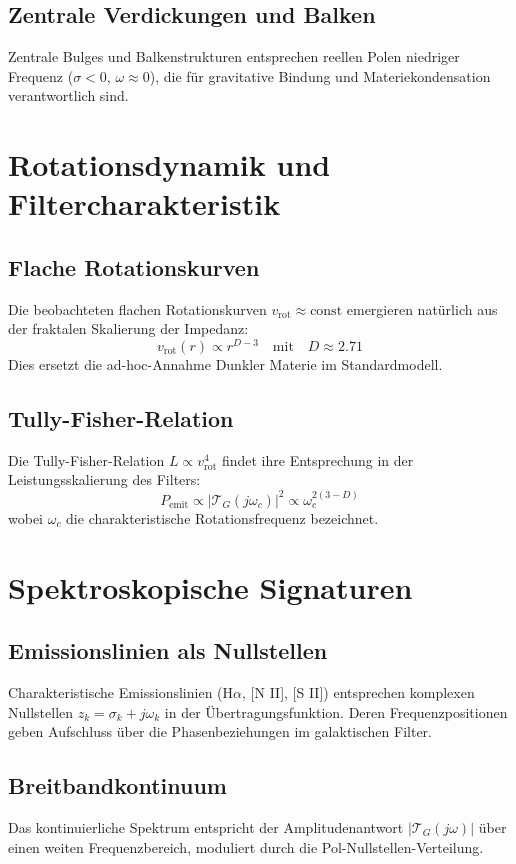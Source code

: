 \subsection{Zentrale Verdickungen und Balken}
Zentrale Bulges und Balkenstrukturen entsprechen reellen Polen niedriger Frequenz ($\sigma < 0$, $\omega \approx 0$), die für gravitative Bindung und Materiekondensation
verantwortlich sind.

\section{Rotationsdynamik und Filtercharakteristik}

\subsection{Flache Rotationskurven}
Die beobachteten flachen Rotationskurven $v_{\text{rot}} \approx \text{const}$ emergieren natürlich aus der fraktalen Skalierung der Impedanz:
\[
v_{\text{rot}}(r) \propto r^{D-3} \quad \text{mit} \quad D \approx 2.71
\]
Dies ersetzt die ad-hoc-Annahme Dunkler Materie im Standardmodell.

\subsection{Tully-Fisher-Relation}
Die Tully-Fisher-Relation $L \propto v_{\text{rot}}^4$ findet ihre Entsprechung in der Leistungsskalierung des Filters:
\[
P_{\text{emit}} \propto |\mathcal{T}_G(j\omega_c)|^2 \propto \omega_c^{2(3-D)}
\]
wobei $\omega_c$ die charakteristische Rotationsfrequenz bezeichnet.

\section{Spektroskopische Signaturen}

\subsection{Emissionslinien als Nullstellen}
Charakteristische Emissionslinien (H$\alpha$, [N II], [S II]) entsprechen komplexen Nullstellen $z_k = \sigma_k + j\omega_k$ in der Übertragungsfunktion. Deren 
Frequenzpositionen geben Aufschluss über die Phasenbeziehungen im galaktischen Filter.

\subsection{Breitbandkontinuum}
Das kontinuierliche Spektrum entspricht der Amplitudenantwort $|\mathcal{T}_G(j\omega)|$ über einen weiten Frequenzbereich, moduliert durch die Pol-Nullstellen-Verteilung.

